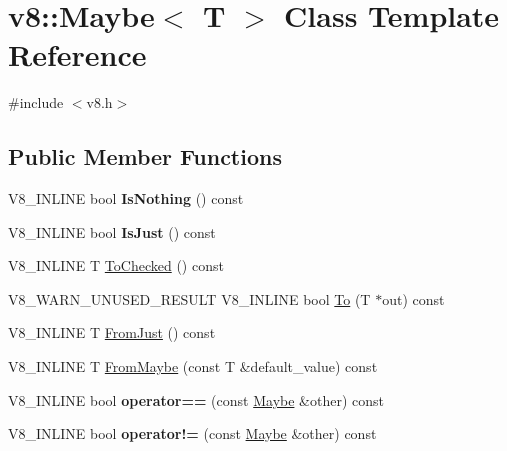 \hypertarget{classv8_1_1Maybe}{}\section{v8\+:\+:Maybe$<$ T $>$ Class Template Reference}
\label{classv8_1_1Maybe}


{\ttfamily \#include $<$v8.\+h$>$}

\subsection*{Public Member Functions}
\begin{DoxyCompactItemize}
\item 
\mbox{\label{classv8_1_1Maybe_ae78f3cea1ba1913f81ca4f4751eb4f32}} 
V8\+\_\+\+I\+N\+L\+I\+NE bool {\bfseries Is\+Nothing} () const
\item 
\mbox{\label{classv8_1_1Maybe_a9f9150acc7eefe3dcb20b073bacd740f}} 
V8\+\_\+\+I\+N\+L\+I\+NE bool {\bfseries Is\+Just} () const
\item 
V8\+\_\+\+I\+N\+L\+I\+NE T \mbox{\hyperlink{classv8_1_1Maybe_abf2c0453c947f8c03f8e24b94887d33b}{To\+Checked}} () const
\item 
V8\+\_\+\+W\+A\+R\+N\+\_\+\+U\+N\+U\+S\+E\+D\+\_\+\+R\+E\+S\+U\+LT V8\+\_\+\+I\+N\+L\+I\+NE bool \mbox{\hyperlink{classv8_1_1Maybe_a7d1d77e5fd55f125fb4c41db1335bd09}{To}} (T $\ast$out) const
\item 
V8\+\_\+\+I\+N\+L\+I\+NE T \mbox{\hyperlink{classv8_1_1Maybe_a6c35f4870a5b5049d09ba5f13c67ede9}{From\+Just}} () const
\item 
V8\+\_\+\+I\+N\+L\+I\+NE T \mbox{\hyperlink{classv8_1_1Maybe_a4b95361b73d9af3dddd975accca89a5f}{From\+Maybe}} (const T \&default\+\_\+value) const
\item 
\mbox{\label{classv8_1_1Maybe_aca04e8431f10cf8d335ee7aa4e64d9ac}} 
V8\+\_\+\+I\+N\+L\+I\+NE bool {\bfseries operator==} (const \mbox{\hyperlink{classv8_1_1Maybe}{Maybe}} \&other) const
\item 
\mbox{\label{classv8_1_1Maybe_a3114cd0871d89142c15e0a3cd2d3c592}} 
V8\+\_\+\+I\+N\+L\+I\+NE bool {\bfseries operator!=} (const \mbox{\hyperlink{classv8_1_1Maybe}{Maybe}} \&other) const
\end{DoxyCompactItemize}
